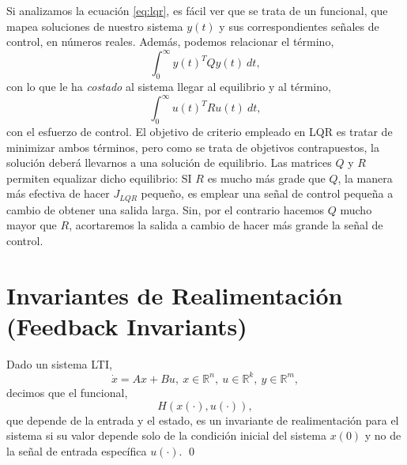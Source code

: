 Si analizamos la ecuación \ref{eq:lqr}, es fácil ver que se trata de un funcional, que mapea soluciones de nuestro sistema $y(t)$ y sus correspondientes señales de control, en números reales. Además, podemos relacionar el término,
\begin{equation*}
\int_0^{\infty}y(t)^TQy(t)\ dt,
\end{equation*}
con lo que le ha \emph{costado} al sistema llegar al equilibrio y al término,
\begin{equation*}
\int_0^{\infty}u(t)^TRu(t)\ dt,
\end{equation*} 
con el esfuerzo de control. El objetivo de criterio empleado en LQR es tratar de minimizar ambos términos, pero como se trata de objetivos contrapuestos, la solución deberá llevarnos a una solución de equilibrio. Las matrices $Q$ y $R$ permiten equalizar dicho equilibrio: SI  $R$ es mucho más grade que $Q$, la manera más efectiva de hacer $J_{LQR}$ pequeño, es emplear una señal de control pequeña a cambio de obtener una salida larga. Sin, por el contrario hacemos $Q$ mucho mayor que $R$, acortaremos la salida a cambio de hacer más grande la señal de control.

\section{Invariantes de Realimentación (Feedback Invariants)}
\begin{definition}
Dado un sistema LTI,
\begin{equation*}
\dot{x} =Ax+Bu,\ x \in \mathbb{R}^n,\ u \in \mathbb{R}^k,\ y \in \mathbb{R}^m,
\end{equation*}
decimos que el funcional,
\begin{equation*}
H\left(x(\cdot),u(\cdot)\right),
\end{equation*}
que depende de la entrada y el estado, es un invariante de realimentación para el sistema si su valor depende solo de la condición inicial del sistema $x(0)$ y no de la señal de entrada específica $u(\cdot)$.
\qed
\end{definition}

